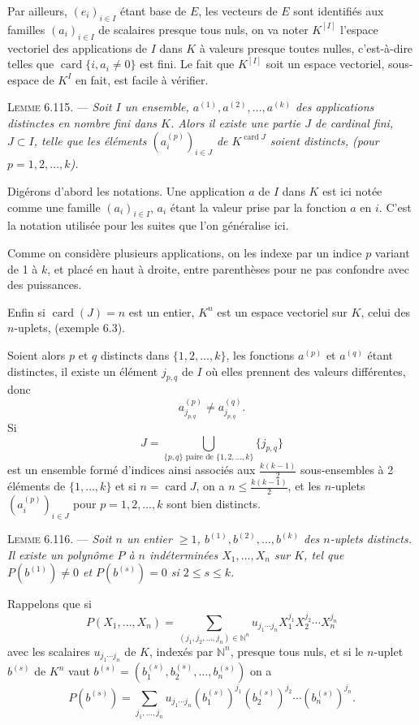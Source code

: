 Par ailleurs, $(e_i)_{i\in I}$ étant base de $E$, les vecteurs de $E$ sont identifiés aux familles $(a_i)_{i\in I}$ de scalaires presque tous nuls, on va noter $K^{[I]}$ l'espace vectoriel des applications de $I$ dans $K$ à valeurs presque toutes nulles, c'est-à-dire telles que $\operatorname{card}\{i,a_i\ne0\}$ est fini. Le fait que $K^{[I]}$ soit un espace vectoriel, sous-espace de $K^I$ en fait, est facile à vérifier.

\medskip\noindent\textsc{Lemme 6.115.} --- \emph{Soit $I$ un ensemble, $a^{(1)},a^{(2)},\ldots,a^{(k)}$ des applications distinctes en nombre fini dans $K$. Alors il existe une partie $J$ de cardinal fini, $J\subset I$, telle que les éléments $(a_i^{(p)})_{i\in J}$ de $K^{\operatorname{card}J}$ soient distincts, (pour $p=1,2,\ldots,k$).}

Digérons d'abord les notations. Une application $a$ de $I$ dans $K$ est ici notée comme une famille $(a_i)_{i\in I}$, $a_i$ étant la valeur prise par la fonction $a$ en $i$. C'est la notation utilisée pour les suites que l'on généralise ici.

Comme on considère plusieurs applications, on les indexe par un indice $p$ variant de 1 à $k$, et placé en haut à droite, entre parenthèses pour ne pas confondre avec des puissances.

Enfin si $\operatorname{card}(J)=n$ est un entier, $K^n$ est un espace vectoriel sur $K$, celui des $n$-uplets, (exemple 6.3).

Soient alors $p$ et $q$ distincts dans $\{1,2,\ldots,k\}$, les fonctions $a^{(p)}$ et $a^{(q)}$ étant distinctes, il existe un élément $j_{p,q}$ de $I$ où elles prennent des valeurs différentes, donc
\[
a_{j_{p,q}}^{(p)}\ne a_{j_{p,q}}^{(q)}.
\]
Si
\[
J=\bigcup_{\{p,q\}\text{ paire de }\{1,2,\ldots,k\}}\{j_{p,q}\}
\]
est un ensemble formé d'indices ainsi associés aux $\frac{k(k-1)}2$ sous-ensembles à 2 éléments de $\{1,\ldots,k\}$ et si $n=\operatorname{card}J$, on a $n\le\frac{k(k-1)}2$, et les $n$-uplets $(a_i^{(p)})_{i\in J}$ pour $p=1,2,\ldots,k$ sont bien distincts. \bookend

\medskip\noindent\textsc{Lemme 6.116.} --- \emph{Soit $n$ un entier $\ge1$, $b^{(1)},b^{(2)},\ldots,b^{(k)}$ des $n$-uplets distincts. Il existe un polynôme $P$ à $n$ indéterminées $X_1,\ldots,X_n$ sur $K$, tel que $P(b^{(1)})\ne0$ et $P(b^{(s)})=0$ si $2\le s\le k$.}

Rappelons que si
\[
P(X_1,\ldots,X_n)=\sum_{(j_1,j_2,\ldots,j_n)\in\mathbb N^n}u_{j_1\cdots j_n}X_1^{j_1}X_2^{j_2}\cdots X_n^{j_n}
\]
avec les scalaires $u_{j_1\cdots j_n}$ de $K$, indexés par $\mathbb N^n$, presque tous nuls, et si le $n$-uplet $b^{(s)}$ de $K^n$ vaut $b^{(s)}=(b_1^{(s)},b_2^{(s)},\ldots,b_n^{(s)})$ on a
\[
P(b^{(s)})=\sum_{j_1,\ldots,j_n}u_{j_1\cdots j_n}(b_1^{(s)})^{j_1}(b_2^{(s)})^{j_2}\cdots(b_n^{(s)})^{j_n}.
\]

